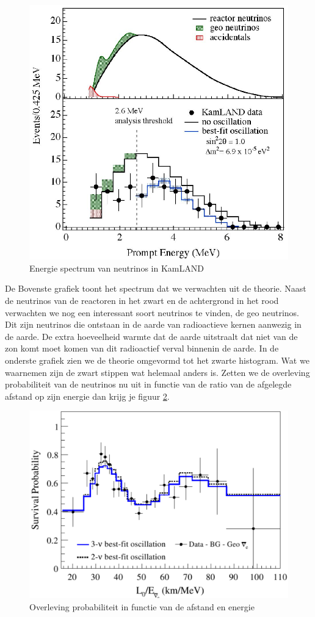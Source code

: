 \documentclass[../main.tex]{subfiles}
\begin{document}
\begin{figure}[h]
    \centering
    \includegraphics[width=0.5\linewidth]{neutrinos/kamland_results.png}
    \caption{Energie spectrum van neutrinos in KamLAND}%
    \label{fig:neutrinos/kamland_results}
\end{figure}

De Bovenste grafiek toont het spectrum dat we verwachten uit de theorie. Naast de neutrinos van de reactoren in het zwart en de achtergrond in het rood verwachten we nog een interessant soort neutrinos te vinden, de geo neutrinos. Dit zijn neutrinos die ontstaan in de aarde van radioactieve kernen aanwezig in de aarde. De extra hoeveelheid warmte dat de aarde uitstraalt dat niet van de zon komt moet komen van dit radioactief verval binnenin de aarde. In de onderste grafiek zien we de theorie omgevormd tot het zwarte histogram. Wat we waarnemen zijn de zwart stippen wat helemaal anders is. Zetten we de overleving probabiliteit van de neutrinos nu uit in functie van de ratio van de afgelegde afstand op zijn energie dan krijg je figuur \ref{fig:neutrinos/kamland_osc}.

\begin{figure}[h]
    \centering
    \includegraphics[width=0.6\linewidth]{neutrinos/kamland_osc.png}
    \caption{Overleving probabiliteit in functie van de afstand en energie}%
    \label{fig:neutrinos/kamland_osc}
\end{figure}
\end{document}

